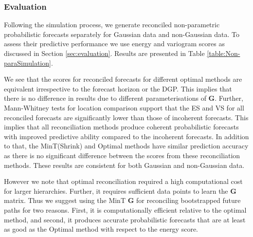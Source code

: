 \documentclass[12pt]{article}
\theoremstyle{definition}
\begin{document}
\subsubsection{Evaluation}

Following the simulation process, we generate reconciled non-parametric probabilistic forecasts separately for Gaussian data and non-Gaussian data. To assess their predictive performance we use energy and variogram scores as discussed in Section \ref{sec:evaluation}. Results are presented in Table \ref{table:Non-paraSimulation}.

We see that the scores for reconciled forecasts for different optimal methods are equivalent irrespective to the forecast horizon or the DGP. This implies that there is no difference in results due to different parameterisations of $\bm{G}$. Further, Mann-Whitney tests for location comparison support that the ES and VS for all reconciled forecasts are significantly lower than those of incoherent forecasts. This implies that all reconciliation methods produce coherent probabilistic forecasts with improved predictive ability compared to the incoherent forecasts. In addition to that, the MinT(Shrink) and Optimal methods have similar prediction accuracy as there is no significant difference between the scores from these reconciliation methods. These results are consistent for both Gaussian and non-Gaussian data.

However we note that optimal reconciliation required a high computational cost for larger hierarchies. Further, it requires sufficient data points to learn the $\bm{G}$ matrix. Thus we suggest using the MinT $\bm{G}$ for reconciling bootstrapped future paths for two reasons. First, it is computationally efficient relative to the optimal method, and second, it produces accurate probabilistic forecasts that are at least as good as the Optimal method with respect to the energy score.
\end{document}
